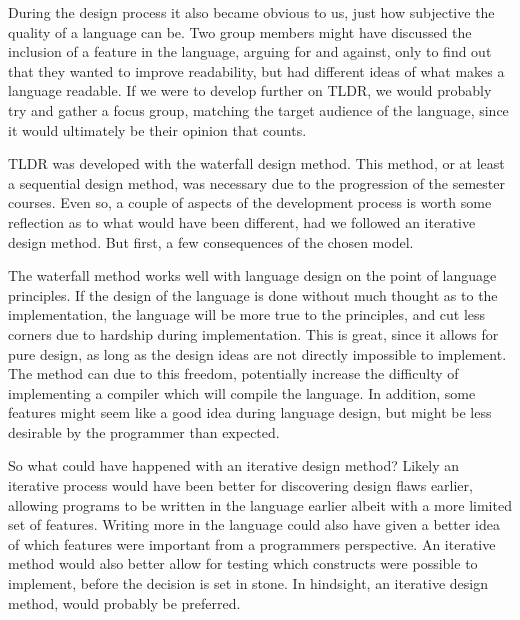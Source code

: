 During the design process it also became obvious to us, just how subjective the quality of a language can be. Two group members might have discussed the inclusion of a feature in the language, arguing for and against, only to find out that they wanted to improve readability, but had different ideas of what makes a language readable. If we were to develop further on TLDR, we would probably try and gather a focus group, matching the target audience of the language, since it would ultimately be their opinion that counts.

TLDR was developed with the waterfall design method. This method, or at least a sequential design method, was necessary due to the progression of the semester courses. Even so, a couple of aspects of the development process is worth some reflection as to what would have been different, had we followed an iterative design method. But first, a few consequences of the chosen model.

The waterfall method works well with language design on the point of language principles. If the design of the language is done without much thought as to the implementation, the language will be more true to the principles, and cut less corners due to hardship during implementation. This is great, since it allows for pure design, as long as the design ideas are not directly impossible to implement. The method can due to this freedom, potentially increase the difficulty of implementing a compiler which will compile the language. In addition, some features might seem like a good idea during language design, but might be less desirable by the programmer than expected.

So what could have happened with an iterative design method? Likely an iterative process would have been better for discovering design flaws earlier, allowing programs to be written in the language earlier albeit with a more limited set of features. Writing more in the language could also have given a better idea of which features were important from a programmers perspective. An iterative method would also better allow for testing which constructs were possible to implement, before the decision is set in stone. In hindsight, an iterative design method, would probably be preferred.
